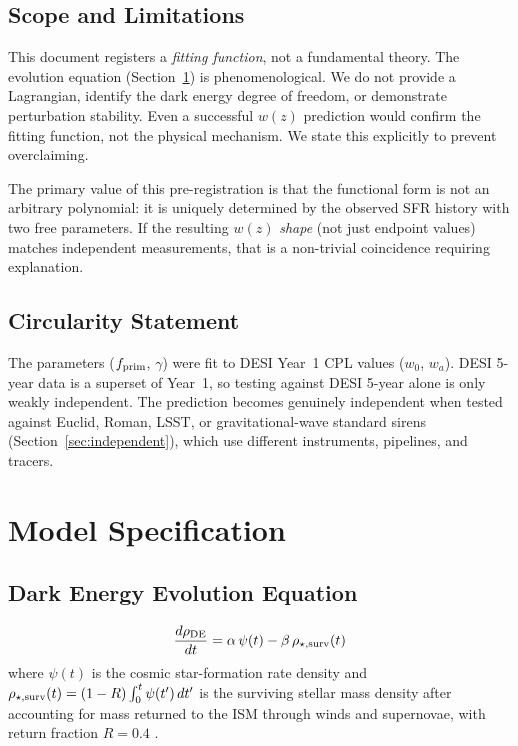 \documentclass[12pt,preprint]{aastex631}
\begin{document}
\subsection{Scope and Limitations}

This document registers a \emph{fitting function}, not a fundamental theory. The evolution equation (Section~\ref{sec:model}) is phenomenological. We do not provide a Lagrangian, identify the dark energy degree of freedom, or demonstrate perturbation stability. Even a successful $w(z)$ prediction would confirm the fitting function, not the physical mechanism. We state this explicitly to prevent overclaiming.

The primary value of this pre-registration is that the functional form is not an arbitrary polynomial: it is uniquely determined by the observed SFR history with two free parameters. If the resulting $w(z)$ \emph{shape} (not just endpoint values) matches independent measurements, that is a non-trivial coincidence requiring explanation.

\subsection{Circularity Statement}

The parameters ($f_{\rm prim}$, $\gamma$) were fit to DESI Year~1 CPL values ($w_0$, $w_a$). DESI 5-year data is a superset of Year~1, so testing against DESI 5-year alone is only weakly independent. The prediction becomes genuinely independent when tested against Euclid, Roman, LSST, or gravitational-wave standard sirens (Section~\ref{sec:independent}), which use different instruments, pipelines, and tracers.

\section{Model Specification}
\label{sec:model}

\subsection{Dark Energy Evolution Equation}

\begin{equation}
\frac{d\rho_{\rm DE}}{dt} = \alpha\,\psi(t) - \beta\,\rho_{\star,\rm surv}(t)
\label{eq:evolution}
\end{equation}
where $\psi(t)$ is the cosmic star-formation rate density and $\rho_{\star,\rm surv}(t) = (1-R)\int_0^t \psi(t')\,dt'$ is the surviving stellar mass density after accounting for mass returned to the ISM through winds and supernovae, with return fraction $R = 0.4$ \citep{LeitnerKravtsov2011}.
\end{document}
